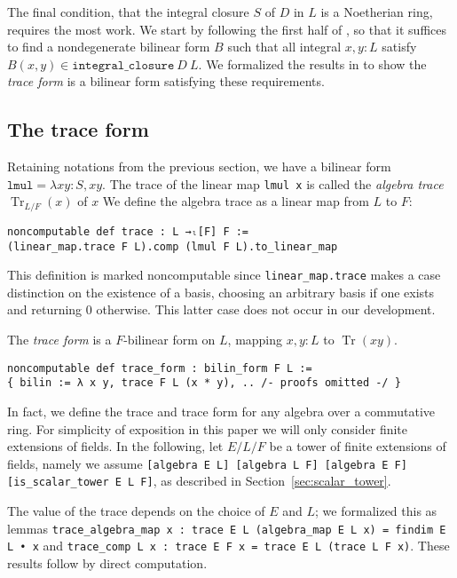 \documentclass[a4paper,USenglish,cleveref, autoref, thm-restate]{lipics-v2021}
\newcommand{\lean}[1]{\texttt{#1}\xspace} %
\DeclareMathOperator{\Tr}{Tr}
\begin{document}
The final condition, that the integral closure $S$ of $D$ in $L$ is a Noetherian ring, requires the most work.
We start by following the first half of \cite[Theorem~15.29]{Dummit-and-Foote},
so that it suffices to find a nondegenerate bilinear form $B$ such that all integral $x, y : L$ satisfy $B(x, y) \in \lean{integral\_closure}\ D\ L$.
We formalized the results in \cite[\S\S~2.5--2.8,]{Neukirch} to show the \emph{trace form} is a bilinear form satisfying these requirements.

\subsection{The trace form}\label{sec:trace-form}
Retaining notations from the previous section, we have a bilinear form $\lean{lmul} = \lambda x y : S, xy$.
The trace of the linear map \lean{lmul x} is called the \emph{algebra trace} $\Tr_{L / F}(x)$ of $x$
We define the algebra trace as a linear map from $L$ to $F$:
\begin{lstlisting}
noncomputable def trace : L →ₗ[F] F :=
(linear_map.trace F L).comp (lmul F L).to_linear_map
\end{lstlisting}
This definition is marked noncomputable since \lean{linear\_map.trace} makes a case distinction on the existence of a basis,
choosing an arbitrary basis if one exists and returning $0$ otherwise.
This latter case does not occur in our development.

The \emph{trace form} is a $F$-bilinear form on $L$, mapping $x, y : L$ to $\Tr(xy)$.
\begin{lstlisting}
noncomputable def trace_form : bilin_form F L :=
{ bilin := λ x y, trace F L (x * y), .. /- proofs omitted -/ }
\end{lstlisting}

In fact, we define the trace and trace form for any algebra over a commutative ring.
For simplicity of exposition in this paper we will only consider finite extensions of fields. %
In the following, let $E / L / F$ be a tower of finite extensions of fields, namely we assume \lean{[algebra E L] [algebra L F] [algebra E F] [is\_scalar\_tower E L F]}, as described in Section~\ref{sec:scalar_tower}.

The value of the trace depends on the choice of $E$ and $L$; we formalized this as lemmas \lean{trace\_algebra\_map x : trace E L (algebra\_map E L x) = findim E L • x} and \lean{trace\_comp L x : trace E F x = trace E L (trace L F x)}.
These results follow by direct computation.
\end{document}

